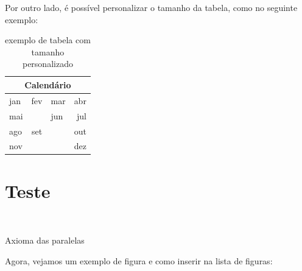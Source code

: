 \documentclass[12pt,oneside]{book} %
\begin{document}
    \vspace{1.5cm}

    \par Por outro lado, é possível personalizar o tamanho da tabela, como no seguinte exemplo:

    \begin{table}[h]
        \begin{center}
            \begin{tabularx}{10cm}{|X|c||Xr} %
                \hline 
                \multicolumn{4}{|c|}{Calendário} \\ \hline \hline
                jan & fev & mar & abr \\ \hline
                mai & & jun & jul \\ \cline{1-1} \cline{3-4}
                ago & set & & out \\
                nov & & & dez
            \end{tabularx}
        \end{center}
        \caption{exemplo de tabela com tamanho personalizado}
    \end{table}

    \section{Teste}

    \

    \par Axioma das paralelas 

    \par Agora, vejamos um exemplo de figura e como inserir na lista de figuras: %
\end{document}

